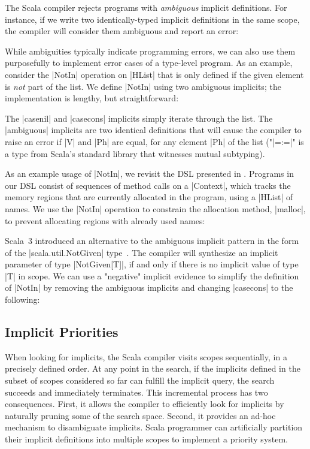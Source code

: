 The Scala compiler rejects programs with \emph{ambiguous} implicit definitions.
For instance, if we write two identically-typed implicit definitions in the same scope, the compiler will consider them ambiguous and report an error:

\implicitAmbiguity

While ambiguities typically indicate programming errors, we can also use them purposefully to implement error cases of a type-level program.
As an example, consider the |NotIn| operation on |HList| that is only defined if the given element is \emph{not} part of the list.
We define |NotIn| using two ambiguous implicits; the implementation is lengthy, but straightforward:

\memImplicitNotIn

\noindent
The |casenil| and |casecons| implicits simply iterate through the list.
The |ambiguous| implicits are two identical definitions that will cause the compiler to raise an error if |V| and |Ph| are equal, for any element |Ph| of the list ("|=:=|" is a type from Scala's standard library that witnesses mutual subtyping).

As an example usage of |NotIn|, we revisit the DSL presented in .
Programs in our DSL consist of sequences of method calls on a |Context|, which tracks the memory regions that are currently allocated in the program, using a |HList| of names.
We use the |NotIn| operation to constrain the allocation method, |malloc|, to prevent allocating regions with already used names:

\memImplicitContextMalloc

Scala~3 introduced an alternative to the ambiguous implicit pattern in the form of the |scala.util.NotGiven| type~\citep[Given Instances]{odersky2013scala}.
The compiler will synthesize an implicit parameter of type |NotGiven[T]|, if and only if there is no implicit value of type |T| in scope.
We can use a "negative" implicit evidence to simplify the definition of |NotIn| by removing the ambiguous implicits and changing |casecons| to the following:

\memImplicitNotGiven

\subsection{Implicit Priorities}

When looking for implicits, the Scala compiler visits scopes sequentially, in a precisely defined order.
At any point in the search, if the implicits defined in the subset of scopes considered so far can fulfill the implicit query, the search succeeds and immediately terminates.
This incremental process has two consequences.
First, it allows the compiler to efficiently look for implicits by naturally pruning some of the search space.
Second, it provides an ad-hoc mechanism to disambiguate implicits.
Scala programmer can artificially partition their implicit definitions into multiple scopes to implement a priority system.

